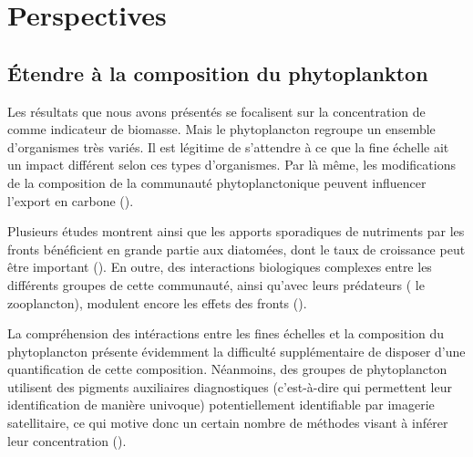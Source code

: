 
\chapter{Perspectives}
\addChpLof
\label{chp:perspectives}
\graphicspath{{resources/perspectives}}

\minitoc%
\clearpage

\section{Étendre à la composition du phytoplankton}
\label{sec:persp-pft}


Les résultats que nous avons présentés se focalisent sur la concentration de  comme indicateur de biomasse.
Mais  le phytoplancton regroupe un ensemble d'organismes très variés.
Il est légitime de s'attendre à ce que la fine échelle ait un impact différent selon ces types d'organismes.
Par là même, les modifications de la composition de la communauté phytoplanctonique peuvent influencer l'export en carbone (\cite{treguer_2018,serra-pompei_2022}).

Plusieurs études montrent ainsi que les apports sporadiques de nutriments par les fronts bénéficient en grande partie aux diatomées, dont le taux de croissance peut être important (\cite{allen_2005,taylor_2012,treguer_2018,hernandez-carrasco_2020}).
En outre, des interactions biologiques complexes entre les différents groupes de cette communauté, ainsi qu'avec leurs prédateurs ( le zooplancton), modulent encore les effets des fronts (\cite{mangolte_2022}).

La compréhension des intéractions entre les fines échelles et la composition du phytoplancton présente évidemment la difficulté supplémentaire de disposer d'une quantification de cette composition.
Néanmoins, des groupes de phytoplancton utilisent des pigments auxiliaires diagnostiques (c'est-à-dire qui permettent leur identification de manière univoque) potentiellement identifiable par imagerie satellitaire, ce qui motive donc un certain nombre de méthodes visant à inférer leur concentration (\cite{uitz_2006,uitz_2010,uitz_2012,pan_2010,pan_2010,organelli_2013,chase_2013,chase_2017,bracher_2015a,xi_2020,xi_2021}).

